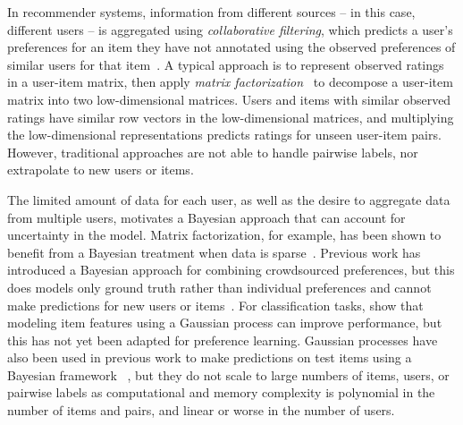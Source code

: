 In recommender systems, information from different sources -- in this case, different users --
 is aggregated using \emph{collaborative filtering},  
which predicts a user's preferences for an item they have not annotated using the observed preferences of 
similar users for that item~\citep{resnick1997recommender}.
A typical approach is to represent observed ratings in a user-item matrix,
then apply \emph{matrix factorization}~\citep{koren2009matrix}
to decompose a user-item matrix into two low-dimensional matrices.
Users and items with similar observed ratings have similar row vectors in the low-dimensional
matrices, and multiplying the low-dimensional representations predicts ratings for unseen
user-item pairs. 
However, traditional approaches are not able to handle pairwise labels,
nor extrapolate to new users or items.

The limited amount of data for each user,
as well as the desire to aggregate data from multiple users,
motivates a Bayesian approach that can account for uncertainty in the model.
Matrix factorization, for example, has been shown to benefit from a Bayesian treatment when data is sparse~\citep{salakhutdinov2008bayesian}. 
Previous work has introduced a Bayesian approach for combining crowdsourced preferences, but this does models only ground truth rather than individual preferences and cannot make predictions for new users or items~\citep{chen2013pairwise}.
For classification tasks, \citet{simpson2017bayesian} show that modeling item features using a Gaussian process can improve performance, but this has not yet been adapted for preference learning.
Gaussian processes have also been used in previous work to make predictions on test items using a Bayesian framework
~\citep{chu2005preference,houlsby2012collaborative,khan2014scalable}, 
but they do not scale to large numbers of items, users, or
pairwise labels as computational and memory complexity is polynomial in the number
of items and pairs, and linear or worse in the number of users.

